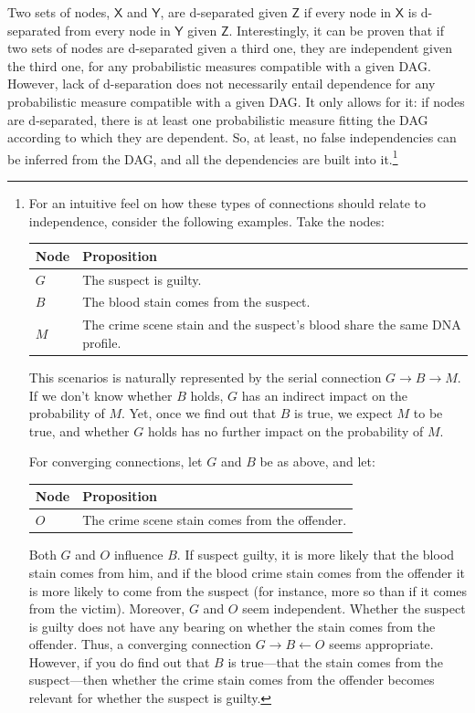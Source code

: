 \documentclass[
  10pt,
  dvipsnames,enabledeprecatedfontcommands]{scrartcl}
\begin{document}
Two sets of nodes, \(\mathsf{X}\) and \(\mathsf{Y}\), are d-separated
given \(\mathsf{Z}\) if every node in \(\mathsf{X}\) is d-separated from
every node in \(\mathsf{Y}\) given \(\mathsf{Z}\). Interestingly, it can
be proven that if two sets of nodes are d-separated given a third one,
they are independent given the third one, for any probabilistic measures
compatible with a given DAG. However, lack of d-separation does not
necessarily entail dependence for any probabilistic measure compatible
with a given DAG. It only allows for it: if nodes are d-separated, there
is at least one probabilistic measure fitting the DAG according to which
they are dependent. So, at least, no false independencies can be
inferred from the DAG, and all the dependencies are built into
it.\footnote{For an intuitive feel on how these types of connections should relate to independence, consider the following examples. Take the nodes:
\footnotesize 
\begin{center}
\begin{tabular}{@{}lp{5.3cm}@{}}\toprule
Node & Proposition \\ \midrule 
$G$ & The suspect is guilty. \\
$B$ & The blood stain comes from the suspect.\\
$M$ & The crime scene stain and the suspect's blood share the same DNA profile.\\
\bottomrule
\end{tabular}
\end{center}
\noindent This scenarios is naturally represented by the serial connection $G \rightarrow B \rightarrow M$. If we don't know whether $B$ holds, $G$ has  an indirect impact on the probability of $M$. Yet, once we find out that $B$ is true, we expect $M$ to be true, and whether $G$ holds has no further impact on the probability of $M$.

For converging connections, let  $G$ and $B$ be as above, and let:

\begin{center}
\begin{tabular}{@{}lp{7.3cm}@{}}\toprule
Node & Proposition \\ \midrule 
$O$ & The crime scene stain comes from the offender.\\
\bottomrule
\end{tabular}
\end{center}

\noindent Both $G$ and $O$ influence $B$. If suspect guilty, it is more likely that the blood stain comes from him, and if the blood crime stain comes from the offender it is more likely to come from the suspect (for instance, more so than if it comes from the victim). Moreover, $G$ and $O$ seem independent. Whether the suspect is guilty does not have any bearing on whether the stain comes from the offender. Thus, a converging connection $G\rightarrow B \leftarrow O$ seems appropriate. However, if you do find out that $B$ is true---that the stain comes from the suspect---then whether the crime stain comes from the offender becomes relevant for whether the suspect is guilty. 

}
\end{document}

